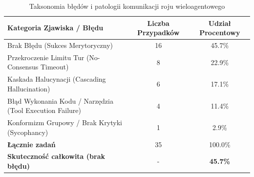 \begin{table}[htbp]
\centering
\caption{Taksonomia błędów i patologii komunikacji roju wieloagentowego}
\label{tab:taksonomia_bledow}
\begin{tabular}{lcc}
\hline
\textbf{Kategoria Zjawiska / Błędu} & \textbf{Liczba Przypadków} & \textbf{Udział Procentowy} \\
\hline
Brak Błędu (Sukces Merytoryczny) & 16 & 45.7\% \\
Przekroczenie Limitu Tur (No-Consensus Timeout) & 8 & 22.9\% \\
Kaskada Halucynacji (Cascading Hallucination) & 6 & 17.1\% \\
Błąd Wykonania Kodu / Narzędzia (Tool Execution Failure) & 4 & 11.4\% \\
Konformizm Grupowy / Brak Krytyki (Sycophancy) & 1 & 2.9\% \\
\hline
\textbf{Łącznie zadań} & 35 & 100.0\% \\
\textbf{Skuteczność całkowita (brak błędu)} & - & \textbf{45.7\%} \\
\hline
\end{tabular}
\end{table}
